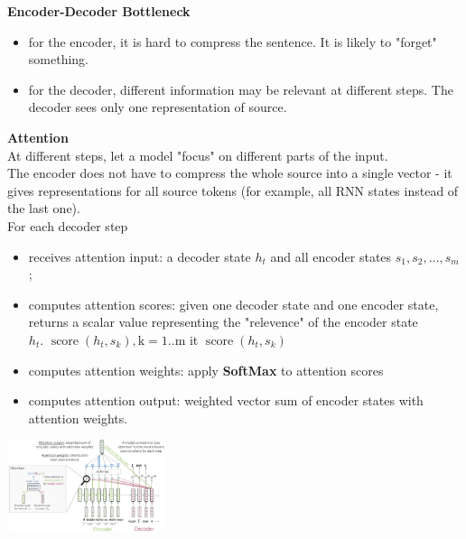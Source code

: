 \documentclass[8pt]{extarticle} %
\begin{document}
\begin{multicols*}{3}
\textbf{Encoder-Decoder Bottleneck}

\begin{itemize}[label=\textbullet, labelsep=0.3em, leftmargin=0.5em, itemsep=0em]
    \item for the encoder, it is hard to compress the sentence. It is likely to "forget" something. 
    \item for the decoder, different information may be relevant at different steps. The decoder sees only one representation of source.
\end{itemize}

\textbf{Attention}\\

At different steps, let a model "focus" on different parts of the input.\\

The encoder does not have to compress the whole source into a single vector - it gives representations for all source tokens (for example, all RNN states instead of the last one).\\
For each decoder step

\begin{itemize}[label=\textbullet, labelsep=0.3em, leftmargin=0.5em, itemsep=0em]
\item receives attention input: a decoder state $h_t$ and all encoder states $s_1, s_2, \ldots, s_m$;\\
\item computes attention scores: given one decoder state and one encoder state, returns a scalar value representing the "relevence" of the encoder state\\
 $h_t$. $\operatorname{score}\left(h_t, s_k\right), \mathrm{k}=1 . . \mathrm{m}$ it  $\operatorname{score}\left(h_t, s_k\right)$\\
\item computes attention weights: apply \textbf{SoftMax} to attention scores
\item computes attention output: weighted vector sum of encoder states with attention weights.\\
\end{itemize}
\begin{center}
    \includegraphics[width=0.35\textwidth]{media/attention.png}
\end{center}


\end{multicols*}
\end{document}

